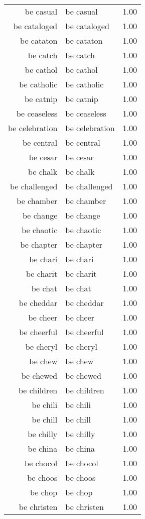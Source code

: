 \begin{table}[ht]
\begin{tabular}{rlr}
  be casual & be casual & 1.00 \\ 
  be cataloged & be cataloged & 1.00 \\ 
  be cataton & be cataton & 1.00 \\ 
  be catch & be catch & 1.00 \\ 
  be cathol & be cathol & 1.00 \\ 
  be catholic & be catholic & 1.00 \\ 
  be catnip & be catnip & 1.00 \\ 
  be ceaseless & be ceaseless & 1.00 \\ 
  be celebration & be celebration & 1.00 \\ 
  be central & be central & 1.00 \\ 
  be cesar & be cesar & 1.00 \\ 
  be chalk & be chalk & 1.00 \\ 
  be challenged & be challenged & 1.00 \\ 
  be chamber & be chamber & 1.00 \\ 
  be change & be change & 1.00 \\ 
  be chaotic & be chaotic & 1.00 \\ 
  be chapter & be chapter & 1.00 \\ 
  be chari & be chari & 1.00 \\ 
  be charit & be charit & 1.00 \\ 
  be chat & be chat & 1.00 \\ 
  be cheddar & be cheddar & 1.00 \\ 
  be cheer & be cheer & 1.00 \\ 
  be cheerful & be cheerful & 1.00 \\ 
  be cheryl & be cheryl & 1.00 \\ 
  be chew & be chew & 1.00 \\ 
  be chewed & be chewed & 1.00 \\ 
  be children & be children & 1.00 \\ 
  be chili & be chili & 1.00 \\ 
  be chill & be chill & 1.00 \\ 
  be chilly & be chilly & 1.00 \\ 
  be china & be china & 1.00 \\ 
  be chocol & be chocol & 1.00 \\ 
  be choos & be choos & 1.00 \\ 
  be chop & be chop & 1.00 \\ 
  be christen & be christen & 1.00 \\ 

\end{tabular}
\end{table}
